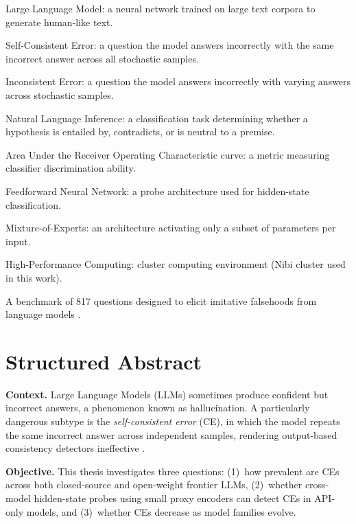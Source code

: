 \documentclass[12pt,twocolumn]{article}
\begin{document}
\begin{description}[style=nextline,leftmargin=1.8cm,font=\normalfont\bfseries,nosep,itemsep=2pt]
\item[LLM] Large Language Model: a neural network trained on large text
      corpora to generate human-like text.
\item[CE] Self-Consistent Error: a question the model answers incorrectly
      with the same incorrect answer across all stochastic samples.
\item[IE] Inconsistent Error: a question the model answers incorrectly
      with varying answers across stochastic samples.
\item[NLI] Natural Language Inference: a classification task determining
      whether a hypothesis is entailed by, contradicts, or is neutral to a
      premise.
\item[AUROC] Area Under the Receiver Operating Characteristic curve: a
      metric measuring classifier discrimination ability.
\item[FFN] Feedforward Neural Network: a probe architecture used for
      hidden-state classification.
\item[MoE] Mixture-of-Experts: an architecture activating only a subset
      of parameters per input.
\item[HPC] High-Performance Computing: cluster computing environment
      (Nibi cluster used in this work).
\item[TruthfulQA] A benchmark of 817 questions designed to elicit
      imitative falsehoods from language models \citep{lin2022truthfulqa}.
\end{description}

\section*{Structured Abstract}

\textbf{Context.}
Large Language Models (LLMs) sometimes produce confident but incorrect
answers, a phenomenon known as hallucination. A particularly dangerous
subtype is the \emph{self-consistent error} (CE), in which the model
repeats the same incorrect answer across independent samples, rendering
output-based consistency detectors ineffective \citep{tan2025consistent}.

\textbf{Objective.}
This thesis investigates three questions: (1)~how prevalent are CEs
across both closed-source and open-weight frontier LLMs, (2)~whether
cross-model hidden-state probes using small proxy encoders can detect
CEs in API-only models, and (3)~whether CEs decrease as model
families evolve.
\end{document}
